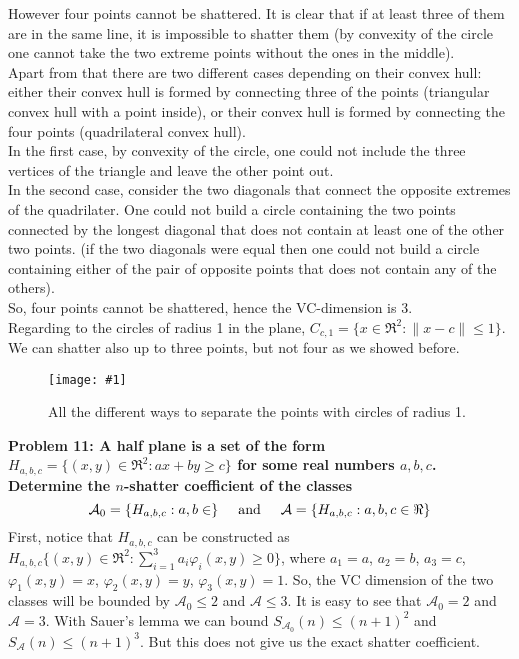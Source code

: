 \documentclass[11pt, english]{article}
\newcommand{\grafico}[5]{
	\begin{figure}
		[h!tbp]
		\centering
		\texttt{[image: \#1]}
		\caption{#4\label{#5}}
	\end{figure}
}
\newcommand{\su}[2]{\sum\limits_{#1}^{#2}}
\begin{document}
However four points cannot be shattered. It is clear that if at least three of them are in the same line, it is impossible to shatter them (by convexity of the circle one cannot take the two extreme points without the ones in the middle). \\
Apart from that there are two different cases depending on their convex hull: either their convex hull is formed by connecting three of the points (triangular convex hull with a point inside), or their convex hull is formed by connecting the four points (quadrilateral convex hull). \\
In the first case, by convexity of the circle, one could not include the three vertices of the triangle and leave the other point out. \\In the second case, consider the two diagonals that connect the opposite extremes of the quadrilater. One could not build a circle containing the two points connected by the longest diagonal that does not contain at least one of the other two points. (if the two diagonals were equal then one could not build a circle containing either of the pair of opposite points that does not contain any of the others). \\
So, four points cannot be shattered, hence the VC-dimension is 3.
\\

Regarding to the circles of radius 1 in the plane, $C_{c,1}=\{x\in\Re^2:\|x-c\|\leq 1\}$. We can shatter also up to three points, but not four as we showed before.
\grafico{graphics/shatters1.jpeg}{0.4}{0}{All the different ways to separate the points with circles of radius 1.}{shatter1}
\newpage
\textbf{Problem 11: A half plane is a set of the form $H_{a,b,c}= \{(x, y) \in \Re^2:ax + by\geq c\}$ for some real numbers $a, b, c$. Determine the $n$-shatter coefficient of the classes}
\begin{equation}
	\mathcal{A}_0=\{H_{a,b,c}:a,b\in\}\hspace{0.5cm}\text{and} \hspace{0.5cm} \mathcal{A}=\{H_{a,b,c}:a,b,c\in\Re\}
\end{equation}
First, notice that $H_{a,b,c}$ can be constructed as $H_{a,b,c}\{(x, y) \in \Re^2:\su{i=1}{3}a_i\varphi_i(x,y)\geq 0\}$, where $a_1=a$, $a_2=b$, $a_3=c$, $\varphi_1(x,y)=x$, $\varphi_2(x,y)=y$, $\varphi_3(x,y)=1$. So, the VC dimension of the two classes will be bounded by $\mathcal{A}_0\leq 2$ and $\mathcal{A}\leq 3$. It is easy to see that $\mathcal{A}_0= 2$ and $\mathcal{A}= 3$. With Sauer's lemma we can bound $S_{\mathcal{A}_0}(n)\leq (n+1)^2$ and $S_{\mathcal{A}}(n)\leq (n+1)^3$. But this does not give us the exact shatter coefficient.\\
\end{document}

